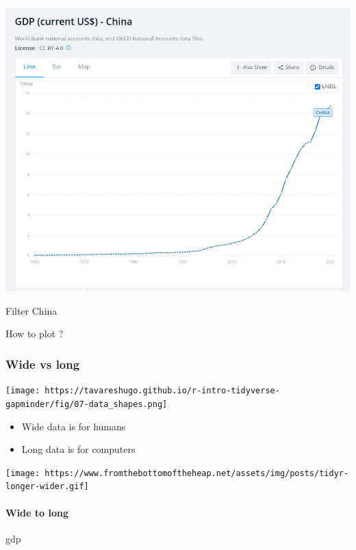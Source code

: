 \documentclass[
]{article}
\begin{document}
\includegraphics{images/2021-11-25_13-05.png}

Filter China

How to plot ?

\hypertarget{wide-vs-long}{%
\subsubsection{Wide vs long}\label{wide-vs-long}}

\texttt{[image: https://tavareshugo.github.io/r-intro-tidyverse-gapminder/fig/07-data\_shapes.png]}

\begin{itemize}
\item
  Wide data is for humans
\item
  Long data is for computers
\end{itemize}

\texttt{[image: https://www.fromthebottomoftheheap.net/assets/img/posts/tidyr-longer-wider.gif]}

\hypertarget{wide-to-long}{%
\paragraph{Wide to long}\label{wide-to-long}}

gdp
\end{document}
